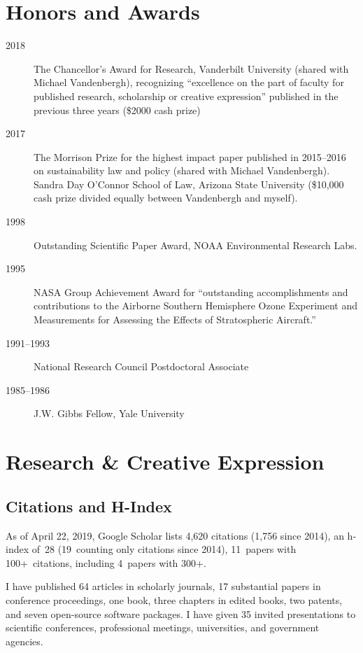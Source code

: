 \documentclass[10pt]{article}
\begin{document}
\section{Honors and Awards}
\begin{description}
\item[2018] The Chancellor's Award for Research, Vanderbilt University (shared with Michael Vandenbergh), recognizing ``excellence on the part of faculty for published research, scholarship or creative expression'' published in the previous three years (\$2000 cash prize)
\item[2017] The Morrison Prize for the highest impact paper published in 2015--2016 on sustainability law and policy (shared with Michael Vandenbergh). Sandra Day O'Connor School of Law, Arizona State University (\$10,000 cash prize divided equally between Vandenbergh and myself).
\item[1998] Outstanding Scientific Paper Award, NOAA Environmental Research Labs.
\item[1995] NASA Group Achievement Award for ``outstanding accomplishments and contributions to the Airborne Southern Hemisphere Ozone Experiment and Measurements for Assessing the Effects of Stratospheric Aircraft.''
\item[1991--1993] National Research Council Postdoctoral Associate
\item[1985--1986] J.W. Gibbs Fellow, Yale University
\end{description}

\section{Research \& Creative Expression}
    \subsection{Citations and H-Index}
        As of April 22, 2019, Google Scholar lists
        4,620 citations (1,756 since 2014),
        an h-index of~28 (19~counting only citations since 2014),
        11~papers with 100+~citations, including 4~papers with 300+.

        I have published 64 articles in scholarly journals, 
        17 substantial papers in conference proceedings, one book,
        three chapters in edited books, two patents, 
        and seven open-source software packages.
        I have given 35 invited presentations to scientific conferences,
        professional meetings, universities, and government agencies.
    \nocite{*}%
\end{document}
